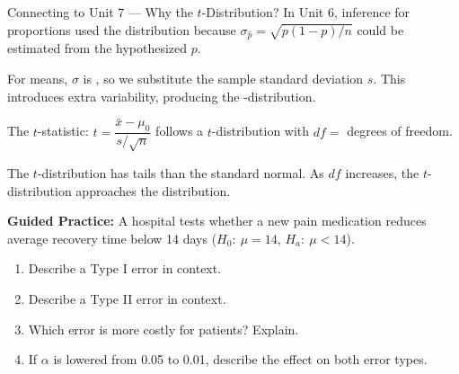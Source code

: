 \documentclass[10pt]{article}
\begin{document}
\begin{notesbox}{Connecting to Unit 7 --- Why the $t$-Distribution?}
In Unit 6, inference for proportions used the  distribution because
$\sigma_{\hat p} = \sqrt{p(1-p)/n}$ could be estimated from the hypothesized $p$.

For means, $\sigma$ is , so we substitute the sample standard
deviation $s$. This introduces extra variability, producing the -distribution.

\vspace{0.1in}
The $t$-statistic: \quad $t = \dfrac{\bar x - \mu_0}{s/\sqrt{n}}$ \quad follows a
$t$-distribution with $df = $  degrees of freedom.

\vspace{0.1in}
The $t$-distribution has  tails than the standard normal.
As $df$ increases, the $t$-distribution approaches the  distribution.
\end{notesbox}

\begin{practicebox}
\textbf{Guided Practice:} A hospital tests whether a new pain medication reduces
average recovery time below 14 days ($H_0{:}\ \mu = 14$, $H_a{:}\ \mu < 14$).

\begin{enumerate}
  \item Describe a Type I error in context.

  \item Describe a Type II error in context.

  \item Which error is more costly for patients? Explain.

  \item If $\alpha$ is lowered from 0.05 to 0.01, describe the effect on both
        error types.
\end{enumerate}
\end{practicebox}
\end{document}
